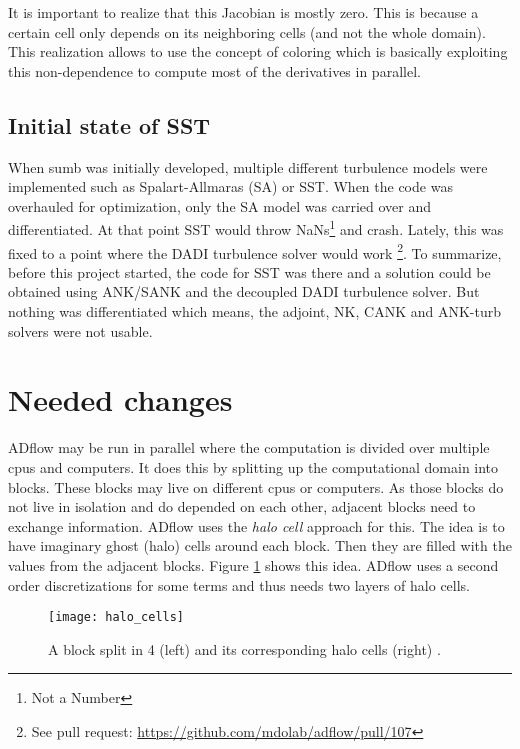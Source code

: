 It is important to realize that this Jacobian is mostly zero. This is because a
certain cell only depends on its neighboring cells (and not the whole domain).
This realization allows to use the concept of coloring which is basically
exploiting this non-dependence to compute most of the derivatives in parallel.
\cite{mdobook}




\subsection{Initial state of SST}
When sumb was initially developed, multiple different turbulence models
were implemented such as Spalart-Allmaras (SA) or SST. When the code was
overhauled for optimization, only the SA model was carried over and
differentiated. At that point SST would throw NaNs\footnote{Not a Number} and
crash. Lately, this was fixed to a point where the DADI turbulence solver would
work \footnote{See pull request:
\url{https://github.com/mdolab/adflow/pull/107}}. To summarize, before this
project started, the code for SST was there and a solution could be obtained
using ANK/SANK and the decoupled DADI turbulence solver. But nothing was
differentiated which means, the adjoint, NK, CANK and ANK-turb solvers were not
usable.








\section{Needed changes}
ADflow may be run in parallel where the computation is divided over multiple
cpus and computers. It does this by splitting up the computational domain into
blocks. These blocks may live on different cpus or computers. As those blocks
do not live in isolation and do depended on each other, adjacent blocks need to
exchange information. ADflow uses the \textit{halo cell} approach for this. The
idea is to have imaginary ghost (halo) cells around each block. Then they are
filled with the values from the adjacent blocks. Figure \ref{fig:halo_cells}
shows this idea. ADflow uses a second order discretizations for some terms and
thus needs two layers of halo cells.

\begin{figure}[H] \centering
\texttt{[image: halo\_cells]}
    \caption{A block split in 4 (left) and its corresponding halo cells (right)
            \cite{cfd_halo}.}
    \label{fig:halo_cells}
\end{figure}




